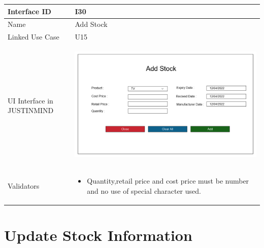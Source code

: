 \documentclass[12pt,a4paper]{report}
\begin{document}
\begin{tabular}{ | m{3cm} | m{12cm}| } \hline

Interface ID & I30  \\\hline

Name  & Add Stock\\ \hline

Linked Use Case & U15	 \\ \hline

UI Interface in JUSTINMIND & \begin{center} \includegraphics[scale=0.3]{./User Interface/UI-029Add Stock.png}\end{center}  \\ \hline

Validators & 
\begin{itemize}
\item   Quantity,retail price and cost price must be number and no use of special character used. 
\end{itemize}
\\ \hline
\end{tabular}
\section{Update Stock Information}
\end{document}
